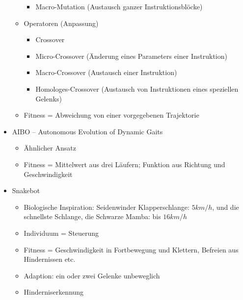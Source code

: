 \begin{itemize}
\begin{itemize}
\begin{itemize}
			\item Macro-Mutation (Austausch ganzer Instruktionsblöcke)
		\end{itemize}
		\item Operatoren (Anpassung)
		\begin{itemize}
			\item Crossover
			\item Micro-Crossover (Änderung eines Parameters einer Instruktion)
			\item Macro-Crossover (Austausch einer Instruktion)
			\item Homologes-Crossover (Austausch von Instruktionen eines speziellen Gelenks)
		\end{itemize}
		\item Fitness = Abweichung von einer vorgegebenen Trajektorie
	\end{itemize}
	\item AIBO -- Autonomous Evolution of Dynamic Gaits
	\begin{itemize}
		\item Ähnlicher Ansatz 
		\item Fitness = Mittelwert aus drei Läufern; Funktion aus Richtung und Geschwindigkeit
	\end{itemize}
	\item Snakebot
	\begin{itemize}
		\item Biologische Inspiration: Seidenwinder Klapperschlange: $5 km/h$, und die schnellste Schlange, die Schwarze Mamba: bis $16 km/h$
		\item Individuum = Steuerung
		\item Fitness = Geschwindigkeit in Fortbewegung und Klettern, Befreien aus Hindernissen etc.\
		\item Adaption: ein oder zwei Gelenke unbeweglich
		\item Hinderniserkennung
	\end{itemize}
\end{itemize}

